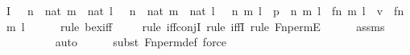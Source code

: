 \begin{isabellebody}
\ I{}{\isacharcolon}{\kern0pt}\ {\isachardoublequoteopen}{\isachardot}{\kern0pt}{\isachardot}{\kern0pt}{\isachardot}{\kern0pt}\ {\isasymlongleftrightarrow}\ {\isacharparenleft}{\kern0pt}{\isasymexists}n\ {\isasymin}\ nat{\isachardot}{\kern0pt}\ {\isasymexists}m\ {\isasymin}\ nat{\isachardot}{\kern0pt}\ {\isasymexists}l\ {\isasymin}\ {}{\isachardot}{\kern0pt}\ {\isacharparenleft}{\kern0pt}{\isasymexists}n{\isacharprime}{\kern0pt}\ {\isasymin}\ nat{\isachardot}{\kern0pt}\ {\isasymexists}m{\isacharprime}{\kern0pt}\ {\isasymin}\ nat{\isachardot}{\kern0pt}\ {\isasymexists}l{\isacharprime}{\kern0pt}\ {\isasymin}\ {}{\isachardot}{\kern0pt}\ {\isacharless}{\kern0pt}{\isacharless}{\kern0pt}n{\isacharprime}{\kern0pt}{\isacharcomma}{\kern0pt}\ m{\isacharprime}{\kern0pt}{\isachargreater}{\kern0pt}{\isacharcomma}{\kern0pt}\ l{\isacharprime}{\kern0pt}{\isachargreater}{\kern0pt}\ {\isasymin}\ p\ {\isasymand}\ {\isacharless}{\kern0pt}{\isacharless}{\kern0pt}n{\isacharcomma}{\kern0pt}\ m{\isachargreater}{\kern0pt}{\isacharcomma}{\kern0pt}\ l{\isachargreater}{\kern0pt}\ {\isacharequal}{\kern0pt}\ {\isacharless}{\kern0pt}{\isacharless}{\kern0pt}f{\isacharbackquote}{\kern0pt}n{\isacharprime}{\kern0pt}{\isacharcomma}{\kern0pt}\ m{\isacharprime}{\kern0pt}{\isachargreater}{\kern0pt}{\isacharcomma}{\kern0pt}\ l{\isacharprime}{\kern0pt}{\isachargreater}{\kern0pt}{\isacharparenright}{\kern0pt}\ {\isasymand}\ v\ {\isacharequal}{\kern0pt}\ {\isacharless}{\kern0pt}{\isacharless}{\kern0pt}f{\isacharprime}{\kern0pt}{\isacharbackquote}{\kern0pt}n{\isacharcomma}{\kern0pt}\ m{\isachargreater}{\kern0pt}{\isacharcomma}{\kern0pt}\ l{\isachargreater}{\kern0pt}{\isacharparenright}{\kern0pt}{\isachardoublequoteclose}\ \isanewline
\ \ \ \ \isamarkupfalse%
{\isacharparenleft}{\kern0pt}rule\ bex{\isacharunderscore}{\kern0pt}iff{\isacharparenright}{\kern0pt}{\isacharplus}{\kern0pt}\isanewline
\ \ \ \ \isamarkupfalse%
{\isacharparenleft}{\kern0pt}rule\ iff{\isacharunderscore}{\kern0pt}conjI{}{\isacharcomma}{\kern0pt}\ rule\ iffI{\isacharcomma}{\kern0pt}\ rule\ Fn{\isacharunderscore}{\kern0pt}permE{\isacharparenright}{\kern0pt}\isanewline
\ \ \ \ \isamarkupfalse%
\ assms\ \isanewline
\ \ \ \ \ \ \ \ \isamarkupfalse%
\ auto{\isacharbrackleft}{\kern0pt}{}{\isacharbrackright}{\kern0pt}\isanewline
\ \ \ \ \ \isamarkupfalse%
{\isacharparenleft}{\kern0pt}subst\ Fn{\isacharunderscore}{\kern0pt}perm{\isacharunderscore}{\kern0pt}def{\isacharcomma}{\kern0pt}\ force{\isacharparenright}{\kern0pt}\isanewline

\end{isabellebody}
